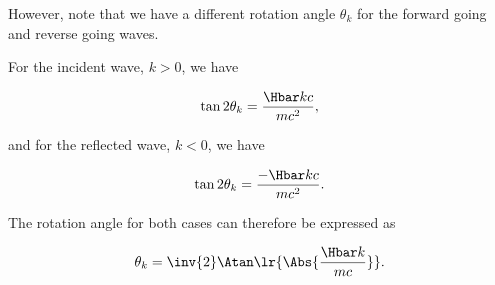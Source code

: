 {However, note that we have a different rotation angle \( \theta_k \) for the forward going and reverse going waves.

For the incident wave, \( k > 0 \), we have

\begin{dmath}\label{eqn:qmLecture9Problems:720}
\tan 2 \theta_k = \frac{ \Hbar k c }{ m c^2 },
\end{dmath}

and for the reflected wave, \( k < 0 \), we have

\begin{dmath}\label{eqn:qmLecture9Problems:740}
\tan 2 \theta_k = \frac{ -\Hbar k c }{ m c^2 }.
\end{dmath}

The rotation angle for both cases can therefore be expressed as

\begin{dmath}\label{eqn:qmLecture9Problems:760}
\theta_k = \inv{2} \Atan\lr{ \Abs{\frac{\Hbar k }{m c}} }.
\end{dmath}

} %


